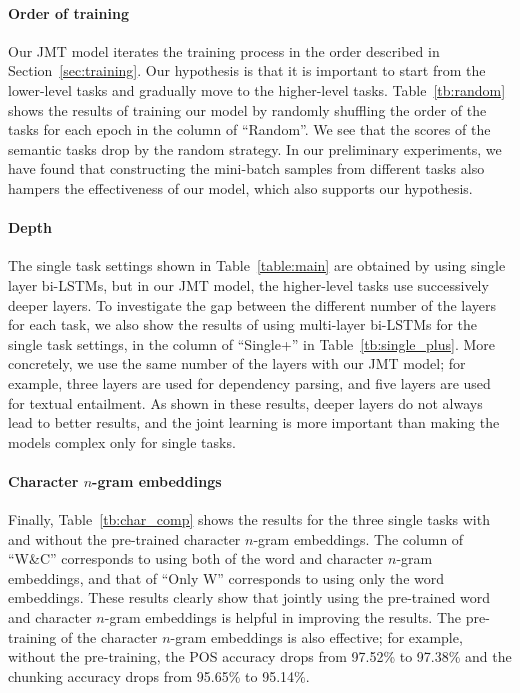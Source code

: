 \documentclass[11pt,a4paper]{article}
\begin{document}
\paragraph{Order of training}
Our JMT model iterates the training process in the order described in Section~\ref{sec:training}.
Our hypothesis is that it is important to start from the lower-level tasks and gradually move to the higher-level tasks.
Table~\ref{tb:random} shows the results of training our model by randomly shuffling the order of the tasks for each epoch in the column of ``Random''.
We see that the scores of the semantic tasks drop by the random strategy.
In our preliminary experiments, we have found that constructing the mini-batch samples from different tasks also hampers the effectiveness of our model, which also supports our hypothesis.

\paragraph{Depth}
The single task settings shown in Table~\ref{table:main} are obtained by using single layer bi-LSTMs, but in our JMT model, the higher-level tasks use successively deeper layers.
To investigate the gap between the different number of the layers for each task, we also show the results of using multi-layer bi-LSTMs for the single task settings, in the column of ``Single+'' in Table~\ref{tb:single_plus}.
More concretely, we use the same number of the layers with our JMT model; for example, three layers are used for dependency parsing, and five layers are used for textual entailment.
As shown in these results, deeper layers do not always lead to better results, and the joint learning is more important than making the models complex only for single tasks.

\paragraph{Character $n$-gram embeddings}
Finally, Table~\ref{tb:char_comp} shows the results for the three single tasks with and without the pre-trained character $n$-gram embeddings.
The column of ``W\&C'' corresponds to using both of the word and character $n$-gram embeddings, and that of ``Only W'' corresponds to using only the word embeddings.
These results clearly show that jointly using the pre-trained word and character $n$-gram embeddings is helpful in improving the results.
The pre-training of the character $n$-gram embeddings is also effective;
for example, without the pre-training, the POS accuracy drops from 97.52\% to 97.38\% and the chunking accuracy drops from 95.65\% to 95.14\%.
\end{document}
